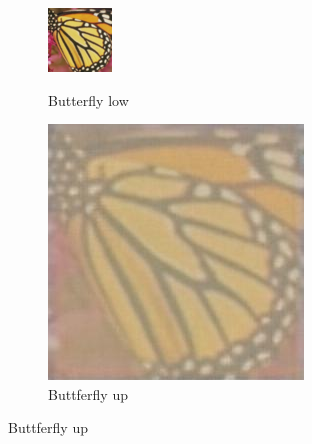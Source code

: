 \documentclass[11pt,twocolumn,twoside,paper=a4]{IEEEtran}
\begin{document}
\begin{figure}[ht]
\par\bigskip

\begin{subfigure}{0.45\textwidth}
  \centering
  \begin{minipage}[b]{0.45\textwidth}
    \includegraphics[width=\textwidth]{../images/butterfly_low.jpg}
    \caption{Butterfly low}
  \end{minipage}
  \hfill
  \begin{minipage}[b]{0.45\textwidth}
    \includegraphics[width=\textwidth]{../images/butterfly_up.jpg}
    \caption{Buttferfly up}
  \end{minipage}
\end{subfigure}


\end{figure}
\end{document}
